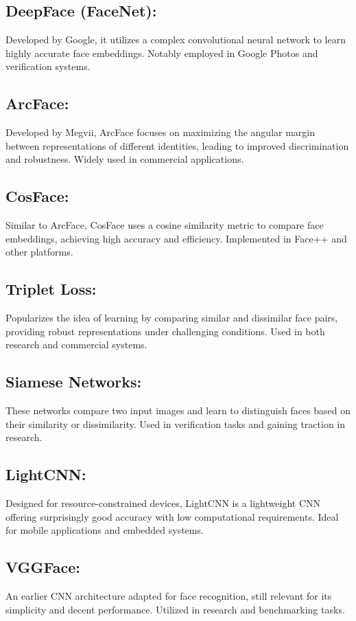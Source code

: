 \documentclass[11pt]{article}
\begin{document}
\subsection*{DeepFace (FaceNet):}
Developed by Google, it utilizes a complex convolutional neural network to learn highly accurate face embeddings. Notably employed in Google Photos and verification systems.

\subsection*{ArcFace:}
Developed by Megvii, ArcFace focuses on maximizing the angular margin between representations of different identities, leading to improved discrimination and robustness. Widely used in commercial applications.

\subsection*{CosFace:}
Similar to ArcFace, CosFace uses a cosine similarity metric to compare face embeddings, achieving high accuracy and efficiency. Implemented in Face++ and other platforms.

\subsection*{Triplet Loss:}
Popularizes the idea of learning by comparing similar and dissimilar face pairs, providing robust representations under challenging conditions. Used in both research and commercial systems.

\subsection*{Siamese Networks:}
These networks compare two input images and learn to distinguish faces based on their similarity or dissimilarity. Used in verification tasks and gaining traction in research.

\subsection*{LightCNN:}
Designed for resource-constrained devices, LightCNN is a lightweight CNN offering surprisingly good accuracy with low computational requirements. Ideal for mobile applications and embedded systems.

\subsection*{VGGFace:}
An earlier CNN architecture adapted for face recognition, still relevant for its simplicity and decent performance. Utilized in research and benchmarking tasks.
\end{document}

